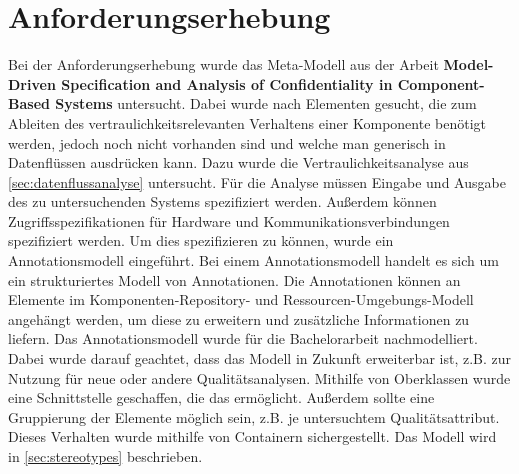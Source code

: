 \section{Anforderungserhebung}
\label{sec:anforderungserhebung}
Bei der Anforderungserhebung wurde das Meta-Modell aus der Arbeit \textbf{Model-Driven Specification and Analysis of Confidentiality in Component-Based Systems} \cite{Kramera} untersucht. Dabei wurde nach Elementen gesucht, die zum Ableiten des vertraulichkeitsrelevanten Verhaltens einer Komponente benötigt werden, jedoch noch nicht vorhanden sind und welche man generisch in Datenflüssen ausdrücken kann. Dazu wurde die Vertraulichkeitsanalyse aus \autoref{sec:datenflussanalyse} untersucht. Für die Analyse müssen Eingabe und Ausgabe des zu untersuchenden Systems spezifiziert werden. Außerdem können Zugriffsspezifikationen für Hardware und Kommunikationsverbindungen spezifiziert werden. Um dies spezifizieren zu können, wurde ein Annotationsmodell eingeführt. Bei einem Annotationsmodell handelt es sich um ein strukturiertes Modell von Annotationen. Die Annotationen können an Elemente im Komponenten-Repository- und Ressourcen-Umgebungs-Modell angehängt werden, um diese zu erweitern und zusätzliche Informationen zu liefern. Das Annotationsmodell wurde für die Bachelorarbeit nachmodelliert. Dabei wurde darauf geachtet, dass das Modell in Zukunft erweiterbar ist, z.B. zur Nutzung für neue oder andere Qualitätsanalysen. Mithilfe von Oberklassen wurde eine Schnittstelle geschaffen, die das ermöglicht. Außerdem sollte eine Gruppierung der Elemente möglich sein, z.B. je untersuchtem Qualitätsattribut. Dieses Verhalten wurde mithilfe von Containern sichergestellt. Das Modell wird in \autoref{sec:stereotypes} beschrieben. \par 
